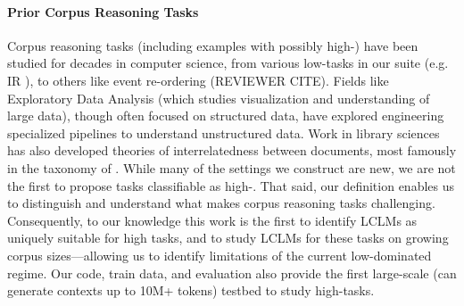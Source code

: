 

\paragraph{Prior Corpus Reasoning Tasks} Corpus reasoning tasks (including examples with possibly high-\cname) have been studied for decades in computer science, from various low-\cname tasks in our suite (e.g. IR \cite{TREC2021}), to others like event re-ordering (REVIEWER CITE). Fields like Exploratory Data Analysis \citep{Tukey1962TheFO} (which studies visualization and  understanding of large data), though often focused on structured data, have explored engineering specialized pipelines \cite{Shankar2024DocETLAQ} to understand unstructured data. Work in library sciences has also developed theories of interrelatedness between documents, most famously in the taxonomy of \citet{Tillett1991ATO}. While many of the settings we construct are new, we are not the first to propose tasks classifiable as high-\cname. That said, our \cname definition enables us to distinguish and understand what makes corpus reasoning tasks challenging. Consequently, to our knowledge this work is the first to identify LCLMs as uniquely suitable for high \cname tasks, and to study LCLMs for these tasks on growing corpus sizes---allowing us to identify limitations of the current low-\cname dominated regime. Our code, train data, and evaluation also provide the first large-scale (can generate contexts up to 10M+ tokens) testbed to study high-\cname tasks. 

